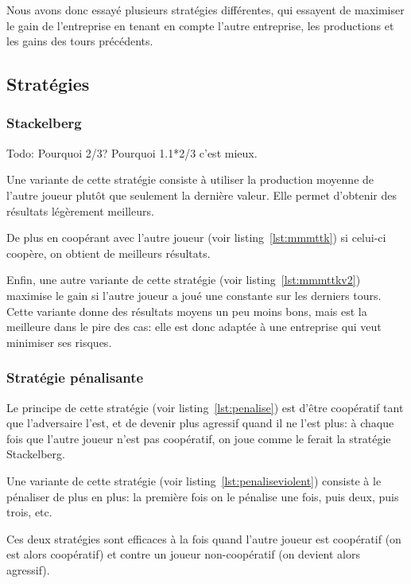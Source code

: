 \documentclass{scrartcl}
\begin{document}
    Nous avons donc essayé plusieurs stratégies différentes, qui essayent de
    maximiser le gain de l'entreprise en tenant en compte l'autre entreprise,
    les productions et les gains des tours précédents.

  \subsection{Stratégies}
    \subsubsection{Stackelberg}
      Todo: Pourquoi 2/3? Pourquoi 1.1*2/3 c'est mieux.

      Une variante de cette stratégie consiste à utiliser la production moyenne
      de l'autre joueur plutôt que seulement la dernière valeur. Elle permet
      d'obtenir des résultats légèrement meilleurs.

      De plus en coopérant avec l'autre joueur (voir listing~\ref{lst:mmmttk})
      si celui-ci coopère, on obtient de meilleurs résultats.

      Enfin, une autre variante de cette stratégie (voir
      listing~\ref{lst:mmmttkv2}) maximise le gain si l'autre joueur a joué une
      constante sur les derniers tours. Cette variante donne des résultats
      moyens un peu moins bons, mais est la meilleure dans le pire des cas:
      elle est donc adaptée à une entreprise qui veut minimiser ses risques.

    \subsubsection{Stratégie pénalisante}
      Le principe de cette stratégie (voir listing~\ref{lst:penalise}) est
      d'être coopératif tant que l'adversaire l'est, et de devenir plus
      agressif quand il ne l'est plus: à chaque fois que l'autre joueur n'est
      pas coopératif, on joue comme le ferait la stratégie Stackelberg.

      Une variante de cette stratégie (voir listing~\ref{lst:penaliseviolent})
      consiste à le pénaliser de plus en plus: la première fois on le pénalise
      une fois, puis deux, puis trois, etc.

      Ces deux stratégies sont efficaces à la fois quand l'autre joueur est
      coopératif (on est alors coopératif) et contre un joueur non-coopératif
      (on devient alors agressif).
\end{document}
